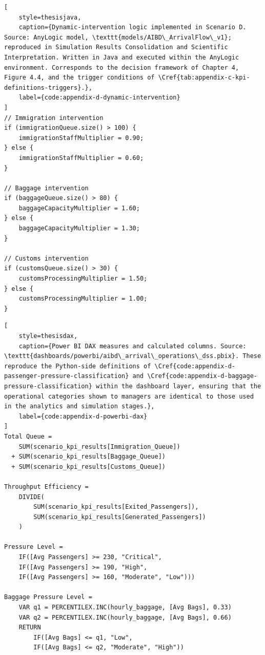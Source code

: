 \begin{lstlisting}[
    style=thesisjava,
    caption={Dynamic-intervention logic implemented in Scenario D. Source: AnyLogic model, \texttt{models/AIBD\_ArrivalFlow\_v1}; reproduced in Simulation Results Consolidation and Scientific Interpretation. Written in Java and executed within the AnyLogic environment. Corresponds to the decision framework of Chapter 4, Figure 4.4, and the trigger conditions of \Cref{tab:appendix-c-kpi-definitions-triggers}.},
    label={code:appendix-d-dynamic-intervention}
]
// Immigration intervention
if (immigrationQueue.size() > 100) {
    immigrationStaffMultiplier = 0.90;
} else {
    immigrationStaffMultiplier = 0.60;
}

// Baggage intervention
if (baggageQueue.size() > 80) {
    baggageCapacityMultiplier = 1.60;
} else {
    baggageCapacityMultiplier = 1.30;
}

// Customs intervention
if (customsQueue.size() > 30) {
    customsProcessingMultiplier = 1.50;
} else {
    customsProcessingMultiplier = 1.00;
}
\end{lstlisting}

\begin{lstlisting}[
    style=thesisdax,
    caption={Power BI DAX measures and calculated columns. Source: \texttt{dashboards/powerbi/aibd\_arrival\_operations\_dss.pbix}. These reproduce the Python-side definitions of \Cref{code:appendix-d-passenger-pressure-classification} and \Cref{code:appendix-d-baggage-pressure-classification} within the dashboard layer, ensuring that the operational categories shown to managers are identical to those used in the analytics and simulation stages.},
    label={code:appendix-d-powerbi-dax}
]
Total Queue =
    SUM(scenario_kpi_results[Immigration_Queue])
  + SUM(scenario_kpi_results[Baggage_Queue])
  + SUM(scenario_kpi_results[Customs_Queue])

Throughput Efficiency =
    DIVIDE(
        SUM(scenario_kpi_results[Exited_Passengers]),
        SUM(scenario_kpi_results[Generated_Passengers])
    )

Pressure Level =
    IF([Avg Passengers] >= 230, "Critical",
    IF([Avg Passengers] >= 190, "High",
    IF([Avg Passengers] >= 160, "Moderate", "Low")))

Baggage Pressure Level =
    VAR q1 = PERCENTILEX.INC(hourly_baggage, [Avg Bags], 0.33)
    VAR q2 = PERCENTILEX.INC(hourly_baggage, [Avg Bags], 0.66)
    RETURN
        IF([Avg Bags] <= q1, "Low",
        IF([Avg Bags] <= q2, "Moderate", "High"))
\end{lstlisting}

